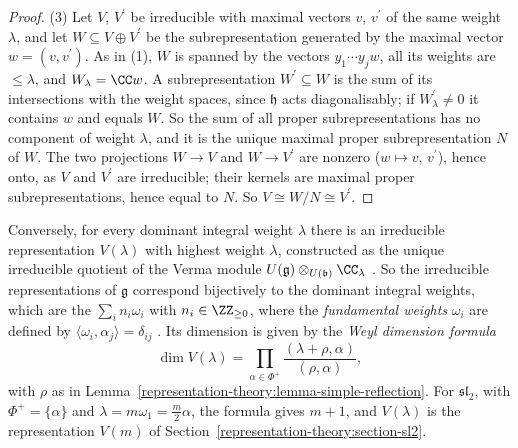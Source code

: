 \begin{proof}
(3) Let $V$, $V^{\prime}$ be irreducible with maximal vectors $v$, $v^{\prime}$ of the same weight $\lambda$, and let $W \subseteq V \oplus V^{\prime}$ be the subrepresentation generated by
the maximal vector $w = (v, v^{\prime})$. As in (1), $W$ is spanned by the vectors $y_1\cdots y_jw$, all its weights are $\leq \lambda$, and $W_\lambda = \CC w$. A subrepresentation
$W^{\prime} \subseteq W$ is the sum of its intersections with the weight spaces, since $\mathfrak{h}$ acts diagonalisably; if $W^{\prime}_\lambda \neq 0$ it contains $w$ and equals $W$. So
the sum of all proper subrepresentations has no component of weight $\lambda$, and it is the unique maximal proper subrepresentation $N$ of $W$. The two projections $W \to V$ and
$W \to V^{\prime}$ are nonzero ($w \mapsto v$, $v^{\prime}$), hence onto, as $V$ and $V^{\prime}$ are irreducible; their kernels are maximal proper subrepresentations, hence equal to $N$.
So $V \cong W/N \cong V^{\prime}$.
\end{proof}

\begin{remark}\label{representation-theory:remark-weyl-character}
Conversely, for every dominant integral weight $\lambda$ there is an irreducible representation $V(\lambda)$ with highest weight $\lambda$, constructed as the unique irreducible quotient of the
Verma module $U(\mathfrak{g}) \otimes_{U(\mathfrak{b})}\CC_\lambda$ \cite[Section 21]{humphreys-lie}. So the irreducible representations of $\mathfrak{g}$ correspond bijectively to the
dominant integral weights, which are the $\sum_in_i\omega_i$ with $n_i \in \ZZ_{\geq 0}$, where the \emph{fundamental weights} $\omega_i$ are defined by $\langle\omega_i, \alpha_j\rangle =
\delta_{ij}$ \cite[Section 13]{humphreys-lie}. Its dimension is given by the \emph{Weyl dimension formula} \cite[Section 24.3]{humphreys-lie}
\[
\dim V(\lambda) = \prod_{\alpha \in \Phi^+}\frac{(\lambda + \rho, \alpha)}{(\rho, \alpha)},
\]
with $\rho$ as in Lemma~\ref{representation-theory:lemma-simple-reflection}. For $\mathfrak{sl}_2$, with $\Phi^+ = \{\alpha\}$ and $\lambda = m\omega_1 = \frac m2\alpha$, the formula gives
$m + 1$, and $V(\lambda)$ is the representation $V(m)$ of Section~\ref{representation-theory:section-sl2}.
\end{remark}

